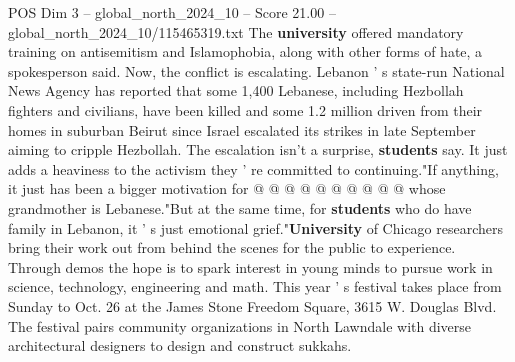 \begin{textsample}{POS Dim 3 – global\_north\_2024\_10 – Score 21.00 – global\_north\_2024\_10/115465319.txt}
The \textbf{university} offered mandatory training on antisemitism and Islamophobia, along with other forms of hate, a spokesperson said.
Now, the conflict is escalating.
Lebanon ' s state-run National News Agency has reported that some 1,400 Lebanese, including Hezbollah fighters and civilians, have been killed and some 1.2 million driven from their homes in suburban Beirut since Israel escalated its strikes in late September aiming to cripple Hezbollah.
The escalation isn't a surprise, \textbf{students} say.
It just adds a heaviness to the activism they ' re committed to continuing."If anything, it just has been a bigger motivation for @ @ @ @ @ @ @ @ @ @ whose grandmother is Lebanese."But at the same time, for \textbf{students} who do have family in Lebanon, it ' s just emotional grief."\textbf{University} of Chicago researchers bring their work out from behind the scenes for the public to experience.
Through demos the hope is to spark interest in young minds to pursue work in science, technology, engineering and math.
This year ' s festival takes place from Sunday to Oct. 26 at the James Stone Freedom Square, 3615 W.
Douglas Blvd.
The festival pairs community organizations in North Lawndale with diverse architectural designers to design and construct sukkahs.

\end{textsample}

